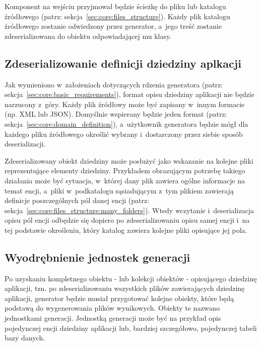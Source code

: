 Komponent na wejściu przyjmował będzie ścieżkę do pliku lub katalogu źródłowego (patrz: sekcja~\ref{sec:core:files_structure}).
Każdy plik katalogu źródłowego zostanie odwiedzony przez generator, a~jego treść zostanie zdeserializowana do obiektu odpowiadającej mu klasy.


\subsection{Zdeserializowanie definicji dziedziny aplkacji}

Jak wymieniono w~założeniach dotyczących rdzenia generatora (patrz: sekcja~\ref{sec:core:basic_requirements}), format opisu dziedziny aplikacji nie będzie narzucony z~góry.
Każdy plik źródłowy może być zapisany w~innym formacie (np. XML lub JSON).
Domyślnie wspierany będzie jeden format (patrz: sekcja~\ref{sec:core:domain_definition}), a~użytkownik generatora będzie mógł dla każdego pliku źródłowego określić wybrany i~dostarczony przez siebie sposób deserializacji.

Zdeserializowany obiekt dziedziny może posłużyć jako wskazanie na kolejne pliki reprezentujące elementy dziedziny.
Przykładem obrazującym potrzebę takiego działania może być sytuacja, w~której dany plik zawiera ogólne informacje na temat encji, a~pliki w~podkatalogu sąsiadującym z~tym plikiem zawierają definicje poszczególnych pól danej encji (patrz: sekcja~\ref{sec:core:files_structure:many_folders}).
Wtedy wczytanie i~deserializacja opisu pól encji odbędzie się dopiero po zdeserializowaniu opisu samej encji i~na tej podstawie określeniu, który katalog zawiera kolejne pliki opisujące jej pola. 


\subsection{Wyodrębnienie jednostek generacji}

Po uzyskaniu kompletnego obiektu - lub kolekcji obiektów - opisującego dziedzinę aplikacji, tzn. po zdeserializowaniu wszystkich plików zawierających dziedzinę aplikacji, generator będzie musiał przygotować kolejne obiekty, które będą podstawą do wygenerowania plików wynikowych.
Obiekty te nazwano jednostkami generacji.
Jednostką generacji może być na przykład opis pojedynczej encji dziedziny aplikacji lub, bardziej szczegółowo, pojedynczej tabeli bazy danych.

